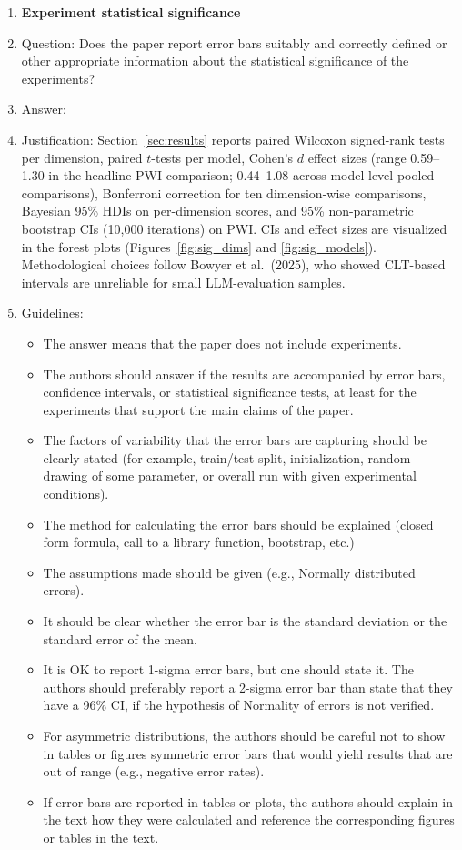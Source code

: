 \begin{enumerate}
\item {\bf Experiment statistical significance}
    \item[] Question: Does the paper report error bars suitably and correctly defined or other appropriate information about the statistical significance of the experiments?
    \item[] Answer: \answerYes{}
    \item[] Justification: Section~\ref{sec:results} reports paired Wilcoxon signed-rank tests per dimension, paired $t$-tests per model, Cohen's $d$ effect sizes (range 0.59--1.30 in the headline PWI comparison; 0.44--1.08 across model-level pooled comparisons), Bonferroni correction for ten dimension-wise comparisons, Bayesian 95\% HDIs on per-dimension scores, and 95\% non-parametric bootstrap CIs (10{,}000 iterations) on PWI. CIs and effect sizes are visualized in the forest plots (Figures~\ref{fig:sig_dims} and \ref{fig:sig_models}). Methodological choices follow Bowyer et al.\ (2025), who showed CLT-based intervals are unreliable for small LLM-evaluation samples.
    \item[] Guidelines:
    \begin{itemize}
        \item The answer \answerNA{} means that the paper does not include experiments.
        \item The authors should answer \answerYes{} if the results are accompanied by error bars, confidence intervals, or statistical significance tests, at least for the experiments that support the main claims of the paper.
        \item The factors of variability that the error bars are capturing should be clearly stated (for example, train/test split, initialization, random drawing of some parameter, or overall run with given experimental conditions).
        \item The method for calculating the error bars should be explained (closed form formula, call to a library function, bootstrap, etc.)
        \item The assumptions made should be given (e.g., Normally distributed errors).
        \item It should be clear whether the error bar is the standard deviation or the standard error of the mean.
        \item It is OK to report 1-sigma error bars, but one should state it. The authors should preferably report a 2-sigma error bar than state that they have a 96\% CI, if the hypothesis of Normality of errors is not verified.
        \item For asymmetric distributions, the authors should be careful not to show in tables or figures symmetric error bars that would yield results that are out of range (e.g., negative error rates).
        \item If error bars are reported in tables or plots, the authors should explain in the text how they were calculated and reference the corresponding figures or tables in the text.
    \end{itemize}


\end{enumerate}
